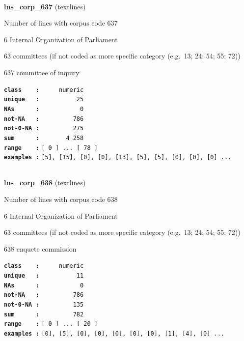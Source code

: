 \documentclass[]{article}
\begin{document}
~

\textbf{lns\_corp\_637} (textlines)

Number of lines with corpus code 637

6 Internal Organization of Parliament

63 committees (if not coded as more specific category (e.g.~13; 24; 54;
55; 72))

637 committee of inquiry

\textbf{\texttt{class\ \ \ \ :}} \texttt{~~~~~numeric}\\
\textbf{\texttt{unique\ \ \ :}} \texttt{~~~~~~~~~~25}\\
\textbf{\texttt{NAs\ \ \ \ \ \ :}} \texttt{~~~~~~~~~~~0}\\
\textbf{\texttt{not-NA\ \ \ :}} \texttt{~~~~~~~~~786}\\
\textbf{\texttt{not-0-NA\ :}} \texttt{~~~~~~~~~275}\\
\textbf{\texttt{sum\ \ \ \ \ \ :}} \texttt{~~~~~~~4~258}\\
\textbf{\texttt{range\ \ \ \ :}}
\texttt{{[}\ 0\ {]}\ ...\ {[}\ 78\ {]}}\\
\textbf{\texttt{examples\ :}}
\texttt{{[}5{]},\ {[}15{]},\ {[}0{]},\ {[}0{]},\ {[}13{]},\ {[}5{]},\ {[}5{]},\ {[}0{]},\ {[}0{]},\ {[}0{]}\ ...}\\

~

\textbf{lns\_corp\_638} (textlines)

Number of lines with corpus code 638

6 Internal Organization of Parliament

63 committees (if not coded as more specific category (e.g.~13; 24; 54;
55; 72))

638 enquete commission

\textbf{\texttt{class\ \ \ \ :}} \texttt{~~~~~numeric}\\
\textbf{\texttt{unique\ \ \ :}} \texttt{~~~~~~~~~~11}\\
\textbf{\texttt{NAs\ \ \ \ \ \ :}} \texttt{~~~~~~~~~~~0}\\
\textbf{\texttt{not-NA\ \ \ :}} \texttt{~~~~~~~~~786}\\
\textbf{\texttt{not-0-NA\ :}} \texttt{~~~~~~~~~135}\\
\textbf{\texttt{sum\ \ \ \ \ \ :}} \texttt{~~~~~~~~~782}\\
\textbf{\texttt{range\ \ \ \ :}}
\texttt{{[}\ 0\ {]}\ ...\ {[}\ 20\ {]}}\\
\textbf{\texttt{examples\ :}}
\texttt{{[}0{]},\ {[}5{]},\ {[}0{]},\ {[}0{]},\ {[}0{]},\ {[}0{]},\ {[}0{]},\ {[}1{]},\ {[}4{]},\ {[}0{]}\ ...}\\
\end{document}
